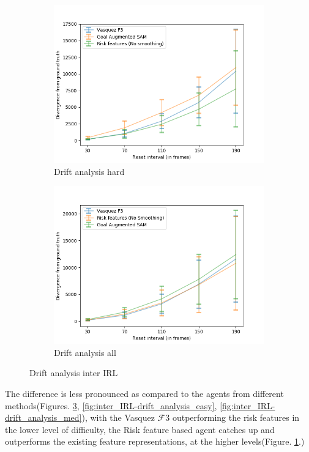 \begin{figure}[htbp]
\begin{subfigure}{0.5\textwidth}
		\centering
		\includegraphics[width=\linewidth]{plots/inter_IRL/drift_analysis_hard.png}
		\caption {Drift analysis hard}
		\label{fig:inter_IRL-drift_analysis_hard}
	\end{subfigure}
	\begin{subfigure}{0.5\textwidth}
		\centering
		\includegraphics[width=\linewidth]{plots/inter_IRL/drift_analysis_all.png}
		\caption {Drift analysis all}
		\label{fig:inter_IRL-drift_analysis_all}
	\end{subfigure}
	\caption{Drift analysis inter IRL}
\end{figure}
The difference is less pronounced as compared to the agents from different methods(Figures. \ref{fig:inter_IRL-drift_analysis_all}, \ref{fig:inter_IRL-drift_analysis_easy}, \ref{fig:inter_IRL-drift_analysis_med}), with the Vasquez $\mathcal{F}3$ outperforming the risk features in the lower level of difficulty, the Risk feature based agent catches up and outperforms the existing feature representations, at the higher levels(Figure. \ref{fig:inter_IRL-drift_analysis_hard}.)

